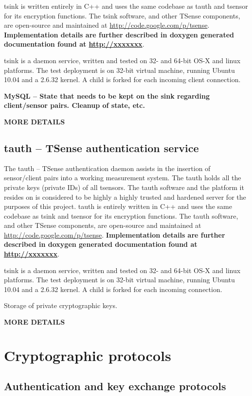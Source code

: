 tsink is written entirely in C++ and uses the same codebase as tauth and tsensor for its encryption functions. The tsink software, and other TSense components, are open-source and maintained at \url{http://code.google.com/p/tsense}. \textbf{Implementation details are further described in doxygen generated documentation found at \url{http://xxxxxxx}}.

tsink is a daemon service, written and tested on 32- and 64-bit OS-X and linux platforms. The test deployment is on 32-bit virtual machine, running Ubuntu 10.04 and a 2.6.32 kernel. A child is forked for each incoming client connection.

\textbf{MySQL -- State that needs to be kept on the sink regarding client/sensor pairs. Cleanup of state, etc.}

\textbf{MORE DETAILS}

\subsection{tauth -- TSense authentication service}

The tauth -- TSense authentication daemon assists in the insertion of sensor/client pairs into a working measurement system. The tauth holds all the private keys (private IDs) of all tsensors. The tauth software and the platform it resides on is considered to be highly a highly trusted and hardened server for the purposes of this project. tauth is entirely written in C++ and uses the same codebase as tsink and tsensor for its encryption functions.  The tauth software, and other TSense components, are open-source and maintained at \url{http://code.google.com/p/tsense}. \textbf{Implementation details are further described in doxygen generated documentation found at \url{http://xxxxxxx}}.

tsink is a daemon service, written and tested on 32- and 64-bit OS-X and linux platforms. The test deployment is on 32-bit virtual machine, running Ubuntu 10.04 and a 2.6.32 kernel. A child is forked for each incoming connection.

Storage of private cryptographic keys.

\textbf{MORE DETAILS}

\section{Cryptographic protocols}

\subsection{Authentication and key exchange protocols}

